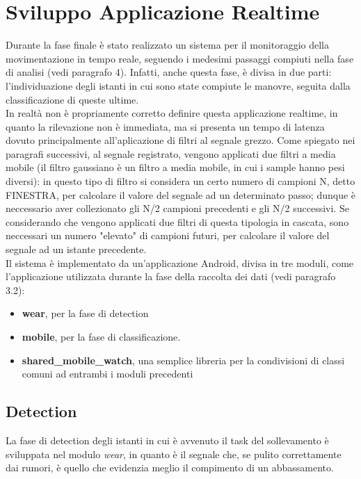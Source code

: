 \documentclass[a4paper, oneside]{book}
\begin{document}
\chapter{Sviluppo Applicazione Realtime}
Durante la fase finale è stato realizzato un sistema per il monitoraggio della movimentazione in tempo reale, seguendo i medesimi passaggi compiuti nella fase di analisi (vedi paragrafo 4). Infatti, anche questa fase, è divisa in due parti: l'individuazione degli istanti in cui sono state compiute le manovre, seguita dalla classificazione di queste ultime.\\
In realtà non è propriamente corretto definire questa applicazione realtime, in quanto la rilevazione non è immediata, ma si presenta un tempo di latenza dovuto principalmente all'aplicazione di filtri al segnale grezzo. Come spiegato nei paragrafi successivi, al segnale registrato, vengono applicati due filtri a media mobile (il filtro gaussiano è un filtro a media mobile, in cui i sample hanno pesi diversi): in questo tipo di filtro si considera un certo numero di campioni N, detto FINESTRA, per calcolare il valore del segnale ad un determinato passo; dunque è neccessario aver collezionato gli N/2 campioni precedenti e gli N/2 successivi. Se considerando che vengono applicati due filtri di questa tipologia in cascata, sono neccessari un numero "elevato" di campioni futuri, per calcolare il valore del segnale ad un istante precedente.\\
Il sistema è implementato da un'applicazione Android, divisa in tre moduli, come l'applicazione utilizzata durante la fase della raccolta dei dati (vedi paragrafo 3.2): 
\begin {itemize}
\item \textbf{wear}, per la fase di detection
\item \textbf{mobile}, per la fase di classificazione.
\item \textbf{shared\_mobile\_watch}, una semplice libreria per la condivisioni di classi comuni ad entrambi i moduli precedenti \\
\end{itemize}


\section{Detection}
La fase di detection degli istanti in cui è avvenuto il task del sollevamento è sviluppata nel modulo \textit{wear}, in quanto è il segnale che, se pulito correttamente dai rumori, è quello che evidenzia meglio il compimento di un abbassamento. 
\end{document}
